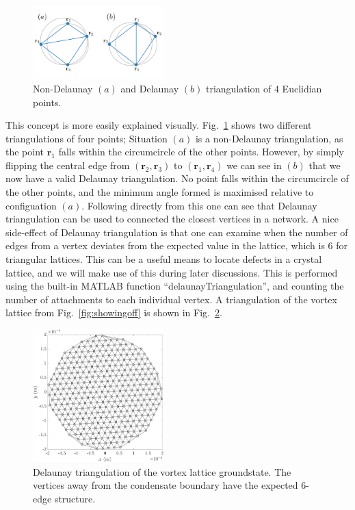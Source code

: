 \begin{figure}\centering
    \includegraphics[width=0.45\textwidth]{Images/ch6_phasegineer/imgs/delaun}
    \caption{Non-Delaunay $(a)$ and Delaunay $(b)$ triangulation of 4 Euclidian points.}\label{fig:delaun}
\end{figure}
This concept is more easily explained visually. Fig.~\ref{fig:delaun} shows two different triangulations of four points; Situation $(a)$ is a non-Delaunay triangulation, as the point $\mathbf{r}_1$ falls within the circumcircle of the other points. However, by simply flipping the central edge from $(\mathbf{r}_2, \mathbf{r}_3)$ to $(\mathbf{r}_1, \mathbf{r}_4)$ we can see in $(b)$ that we now have a valid Delaunay triangulation. No point falls within the circumcircle of the other points, and the minimum angle formed is maximised relative to configuation $(a)$. Following directly from this one can see that Delaunay triangulation can be used to connected the closest vertices in a network. A nice side-effect of Delaunay triangulation is that one can examine when the number of edges from a vertex deviates from the expected value in the lattice, which is 6 for triangular lattices. This can be a useful means to locate defects in a crystal lattice, and we will make use of this during later discussions. This is performed using the built-in \textsc{MATLAB} function ``delaunayTriangulation'', and counting the number of attachments to each individual vertex. A triangulation of the vortex lattice from Fig.~\ref{fig:showingoff} is shown in Fig.~\ref{fig:delaun_vtxlatt}.

\begin{figure}\centering
    \includegraphics[width=0.45\textwidth]{Images/ch4_vtx/Del_tr_VTXLATT}
    \caption{Delaunay triangulation of the vortex lattice groundstate. The vertices away from the condensate boundary have the expected 6-edge structure.}\label{fig:delaun_vtxlatt}
\end{figure}

